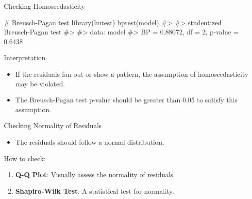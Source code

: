 \documentclass[
  18 pt,
  ignorenonframetext,
  aspectratio=1610,
]{beamer}
\newenvironment{Shaded}{\begin{snugshade}}{\end{snugshade}}
\newcommand{\CommentTok}[1]{\textcolor[rgb]{0.37,0.37,0.37}{#1}}
\newcommand{\FunctionTok}[1]{\textcolor[rgb]{0.28,0.35,0.67}{#1}}
\newcommand{\NormalTok}[1]{\textcolor[rgb]{0.00,0.23,0.31}{#1}}
\providecommand{\tightlist}{%
  \setlength{\itemsep}{0pt}\setlength{\parskip}{0pt}}\usepackage{longtable,booktabs,array}
\begin{document}
\begin{frame}[fragile]{Checking Homoscedasticity}
\protect\hypertarget{checking-homoscedasticity-2}{}
\begin{Shaded}
\begin{Highlighting}[]
\CommentTok{\# Breusch{-}Pagan test}
\FunctionTok{library}\NormalTok{(lmtest)}
\FunctionTok{bptest}\NormalTok{(model)}
\CommentTok{\#\textgreater{} }
\CommentTok{\#\textgreater{}  studentized Breusch{-}Pagan test}
\CommentTok{\#\textgreater{} }
\CommentTok{\#\textgreater{} data:  model}
\CommentTok{\#\textgreater{} BP = 0.88072, df = 2, p{-}value = 0.6438}
\end{Highlighting}
\end{Shaded}

\begin{block}{Interpretation}
\protect\hypertarget{interpretation-5}{}
\begin{itemize}
\tightlist
\item
  If the residuals fan out or show a pattern, the assumption of
  homoscedasticity may be violated.
\item
  The Breusch-Pagan test p-value should be greater than 0.05 to satisfy
  this assumption.
\end{itemize}

\normalsize
\end{block}
\end{frame}

\begin{frame}{Checking Normality of Residuals}
\protect\hypertarget{checking-normality-of-residuals}{}
\begin{itemize}
\tightlist
\item
  The residuals should follow a normal distribution.
\end{itemize}

\begin{block}{How to check:}
\protect\hypertarget{how-to-check-2}{}
\begin{enumerate}
\tightlist
\item
  \textbf{Q-Q Plot}: Visually assess the normality of residuals.
\item
  \textbf{Shapiro-Wilk Test}: A statistical test for normality.
\end{enumerate}
\end{block}
\end{frame}
\end{document}
